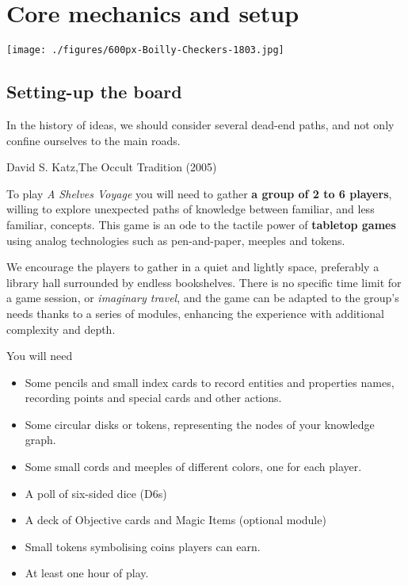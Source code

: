 \documentclass[12pt,a4paper]{book}
\theoremstyle{definition}
\begin{document}
\section{Core mechanics and setup}

\begin{center}
\texttt{[image: ./figures/600px-Boilly-Checkers-1803.jpg]}
\end{center}

\subsection{Setting-up the board}

\epigraph{
In the history of ideas, we should consider several dead-end paths, and not only confine ourselves to the main roads.}
{David S. Katz,The Occult Tradition (2005)} 

To play \textit{A Shelves Voyage} you will need to gather \textbf{a group of 2 to 6 players}, willing to explore unexpected paths of knowledge between familiar, and less familiar, concepts.
This game is an ode to the tactile power of \textbf{tabletop games} using analog technologies such as pen-and-paper, meeples and tokens. 

We encourage the players to gather in a quiet and lightly space, preferably a library hall surrounded by endless bookshelves. There is no specific time limit for a game session, or \textit{imaginary travel}, and the game can be adapted to the group's needs thanks to a series of modules, enhancing the experience with additional complexity and depth.

You will need

\begin{itemize}

\item Some pencils and small index cards to record entities and properties names, recording points and special cards and other actions.

\item Some circular disks or tokens, representing the nodes of your knowledge graph.

\item Some small cords and meeples of different colors, one for each player.

\item A poll of six-sided dice (D6s)

\item A deck of Objective cards and Magic Items (optional module)

\item Small tokens symbolising coins players can earn.

\item At least one hour of play.

\end{itemize}
\end{document}
